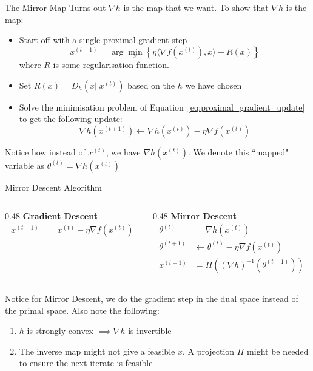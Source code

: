 \begin{frame}{The Mirror Map}
    Turns out $\nabla h$ is the map that we want. To show that $\nabla h$ is the map:
    \begin{itemize}
        \item Start off with a single proximal gradient step
        \begin{equation}\label{eq:proximal_gradient_update}
        x^{(t+1)} = \arg \min_{x} \left\{\eta \langle \nabla f(x^{(t)}), x\rangle + R(x)\right\} 
        \end{equation} where $R$ is some regularisation function. 
    \pause
    \item Set $R(x) = D_h(x||x^{(t)})$ based on the $h$ we have chosen
    \pause
    \item Solve the minimisation problem of Equation~\ref{eq:proximal_gradient_update} to get the following update:
    \begin{equation}
        \nabla h(x^{(t+1)}) \gets \nabla h(x^{(t)}) - \eta \nabla f(x^{(t)})
    \end{equation}
    \end{itemize}
    \pause
    Notice how instead of $x^{(t)}$, we have $\nabla h(x^{(t)})$. We denote this ``mapped" variable as $\theta^{(t)} = \nabla h(x^{(t)})$
\end{frame}


\begin{frame}{Mirror Descent Algorithm}
    \begin{columns}[t] %
        \begin{column}{0.48\textwidth}
            \textbf{Gradient Descent}
            \begin{align*}
                x^{(t+1)} &= x^{(t)} - \eta \nabla f(x^{(t)})
            \end{align*}
        \end{column}\pause       
        \begin{column}{0.48\textwidth}
            \textbf{Mirror Descent}
            \begin{align*}
                \theta^{(t)}&= \nabla h(x^{(t)})\\
                \theta^{(t+1)} &\gets \theta^{(t)} - \eta \nabla f(x^{(t)})\\
                x^{(t+1)}&=\Pi((\nabla h)^{-1}(\theta^{(t+1)}))
            \end{align*}
        \end{column}
\end{columns}
\vspace{0.5cm}\pause
Notice for Mirror Descent, we do the gradient step in the dual space instead of the primal space. Also note the following:
\begin{enumerate}
    \item $h$ is strongly-convex $\implies \nabla h$ is invertible
    \item The inverse map might not give a feasible $x$. A projection $\Pi$ might be needed to ensure the next iterate is feasible
\end{enumerate}
\end{frame}

